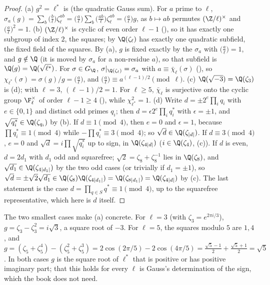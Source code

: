 \begin{proof}
(a) $g^2=\ell^*$ is  (the quadratic Gauss sum). For $a$ prime to $\ell$, $\sigma_a(g)=\sum_b\bigl(\frac b\ell\bigr)\zeta_\ell^{ab}=\bigl(\frac a\ell\bigr)
\sum_b\bigl(\frac{ab}\ell\bigr)\zeta_\ell^{ab}=\bigl(\frac a\ell\bigr)g$, as $b\mapsto ab$ permutes $(\Z/\ell)^\times$ and $\bigl(\frac a\ell\bigr)^2=1$.
(b) $(\Z/\ell)^\times$ is cyclic of even order $\ell-1$ (), so it has exactly one subgroup of index $2$, the squares; by
 $\Q(\zeta_\ell)$ has exactly one quadratic subfield, the fixed field of the squares. By (a), $g$ is fixed exactly by the $\sigma_a$
with $\bigl(\frac a\ell\bigr)=1$, and $g\notin\Q$ (it is moved by $\sigma_a$ for a non-residue $a$), so that subfield is $\Q(g)=\Q(\sqrt{\ell^*})$. For
$\sigma\in G_\Q$, $\sigma|_{\Q(\zeta_\ell)}=\sigma_a$ with $a\equiv\bar\chi_\ell(\sigma)$ (), so
$\chi_{\ell^*}(\sigma)=\sigma(g)/g=\bigl(\frac a\ell\bigr)$, and $\bigl(\frac a\ell\bigr)\equiv a^{(\ell-1)/2}\pmod\ell$.
(c) $\Q(\sqrt{-3})=\Q(\zeta_3)$ is (d); with $\ell=3$, $(\ell-1)/2=1$. For $\ell\ge5$, $\bar\chi_\ell$ is surjective onto the cyclic group
$\F_\ell^\times$ of order $\ell-1\ge4$ (), while $\chi_{\ell^*}^2=1$.
(d) Write $d=\pm2^e\prod_{i}q_i$ with $e\in\{0,1\}$ and distinct odd primes $q_i$; then $d=\epsilon2^e\prod_iq_i^*$ with $\epsilon=\pm1$, and $\sqrt{q_i^*}\in\Q(\zeta_{q_i})$
by (b). If $d\equiv1\pmod4$, then $e=0$ and $\epsilon=1$, because $\prod q_i^*\equiv1\pmod4$ while $-\prod q_i^*\equiv3\pmod 4$; so $\sqrt d\in\Q(\zeta_{|d|})$. If
$d\equiv3\pmod 4$, $e=0$ and $\sqrt d=i\prod\sqrt{q_i^*}$ up to sign, in $\Q(\zeta_{4|d|})$ ($i\in\Q(\zeta_4)$, (c)). If $d$ is even,
$d=2d_1$ with $d_1$ odd and squarefree; $\sqrt2=\zeta_8+\zeta_8^{-1}$ lies in $\Q(\zeta_8)$, and $\sqrt{d_1}\in\Q(\zeta_{4|d_1|})$ by the two odd cases (or trivially if
$d_1=\pm1$), so $\sqrt d=\pm\sqrt2\sqrt{d_1}\in\Q(\zeta_8)\Q(\zeta_{4|d_1|})=\Q(\zeta_{8|d_1|})=\Q(\zeta_{4|d|})$ by (c). The last statement is the case $d=\prod_{q\in S}q^*\equiv1\pmod4$, up to the
squarefree representative, which here is $d$ itself.
\end{proof}

The two smallest cases make (a) concrete. For $\ell=3$ (with $\zeta_3=e^{2\pi i/3}$), $g=\zeta_3-\zeta_3^2=i\sqrt3$, a square root of $-3$. For $\ell=5$, the squares
modulo $5$ are $1,4$, and $g=(\zeta_5+\zeta_5^4)-(\zeta_5^2+\zeta_5^3)=2\cos(2\pi/5)-2\cos(4\pi/5)=\tfrac{\sqrt5-1}2+\tfrac{\sqrt5+1}2=\sqrt5$. In both cases $g$ is the
square root of $\ell^*$ that is positive or has positive imaginary part; that this holds for every $\ell$ is Gauss's determination of the sign, which the book does
not need.


